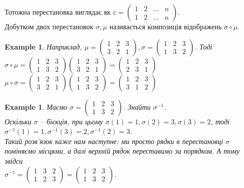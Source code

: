 \documentclass[a4paper, 10pt]{article}
\theoremstyle{theoremdd}
\theoremstyle{theoremdd}
\theoremstyle{theoremdd}
\theoremstyle{theoremdd}
\theoremstyle{theoremdd}
\newtheorem{example}[theorem]{Example}
\theoremstyle{theoremdd}
\theoremstyle{theoremdd}
\theoremstyle{theoremdd}
\theoremstyle{theoremdd}
\theoremstyle{theoremdd}
\theoremstyle{theoremdd}
\theoremstyle{theoremdd}
\theoremstyle{theoremdd}
\theoremstyle{theoremdd}
\theoremstyle{theoremdd}
\begin{document}
Тотожна перестановка виглядає як $\varepsilon = \begin{pmatrix}
1 & 2 & \dots & n \\
1 & 2 & \dots & n
\end{pmatrix}$.\\
Добутком двох перестановок $\sigma,\mu$ називається композиція відображень $\sigma \circ \mu$.

\begin{example}
Наприклад, $\mu = \begin{pmatrix}
1 & 2 & 3 \\
3 & 2 & 1
\end{pmatrix}, \sigma = \begin{pmatrix}
1 & 2 & 3 \\
1 & 3 & 2
\end{pmatrix}$. Тоді\\
$\sigma \circ \mu = \begin{pmatrix}
1 & 2 & 3 \\
1 & 3 & 2
\end{pmatrix} \begin{pmatrix}
1 & 2 & 3 \\
3 & 2 & 1
\end{pmatrix} = \begin{pmatrix}
1 & 2 & 3 \\
2 & 3 & 1
\end{pmatrix}$\\
$\mu \circ \sigma = \begin{pmatrix}
1 & 2 & 3 \\
3 & 2 & 1
\end{pmatrix} \begin{pmatrix}
1 & 2 & 3 \\
1 & 3 & 2
\end{pmatrix} = \begin{pmatrix}
1 & 2 & 3 \\
3 & 1 & 2
\end{pmatrix}$
\end{example}

\begin{example}
Маємо $\sigma = \begin{pmatrix}
1 & 2 & 3 \\
1 & 3 & 2
\end{pmatrix}$. Знайти $\sigma^{-1}$.\\
Оскільки $\sigma$ -- бієкція, при цьому $\sigma(1) = 1, \sigma(2) = 3, \sigma(3) = 2$, тоді $\sigma^{-1}(1) = 1, \sigma^{-1}(3) = 2, \sigma^{-1}(2) = 3$. \\
Такий розв'язок каже нам наступне: ми просто рядки в перестановці $\sigma$ поміняємо місцями, а далі верхній рядок переставимо за порядком. А тому звідси\\
$\sigma^{-1} = \begin{pmatrix}
1 & 3 & 2 \\
1 & 2 & 3
\end{pmatrix} = \begin{pmatrix}
1 & 2 & 3 \\
1 & 3 & 2
\end{pmatrix}$.
\end{example}
\end{document}
